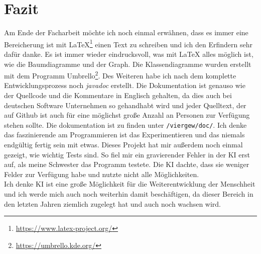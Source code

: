 \documentclass[12pt,a4paper]{article}
\def\code#1{\texttt{#1}}
\begin{document}
	\section{Fazit}
	Am Ende der Facharbeit möchte ich noch einmal erwähnen, dass es immer eine Bereicherung ist mit \LaTeX{}\footnote{\url{https://www.latex-project.org/}} einen Text zu schreiben und ich den Erfindern sehr dafür danke. Es ist immer wieder eindrucksvoll, was mit \LaTeX{} alles möglich ist, wie die Baumdiagramme und der Graph. Die Klassendiagramme wurden erstellt mit dem Programm \glqq Umbrello\grqq{}\footnote{\url{https://umbrello.kde.org/}}. Des Weiteren habe ich nach dem komplette Entwicklungsprozess noch \textit{javadoc} erstellt. Die Dokumentation ist genauso wie der Quellcode und die Kommentare in Englisch gehalten, da dies auch bei deutschen Software Unternehmen so gehandhabt wird und jeder Quelltext, der auf Github ist auch für eine möglichst große Anzahl an Personen zur Verfügung stehen sollte. Die dokumentation ist zu finden unter \code{/viergew/doc/}. Ich denke das faszinierende am Programmieren ist das Experimentieren und das niemals endgültig fertig sein mit etwas. Dieses Projekt hat mir außerdem noch einmal gezeigt, wie wichtig Tests sind. So fiel mir ein gravierender Fehler in der KI erst auf, als meine Schwester das Programm testete. Die KI dachte, dass sie weniger Felder zur Verfügung habe und nutzte nicht alle Möglichkeiten.\\
	Ich denke KI ist eine große Möglichkeit für die Weiterentwicklung der Menschheit und ich werde mich auch noch weiterhin damit beschäftigen, da dieser Bereich in den letzten Jahren ziemlich zugelegt hat und auch noch wachsen wird.
	\newpage
\end{document}
